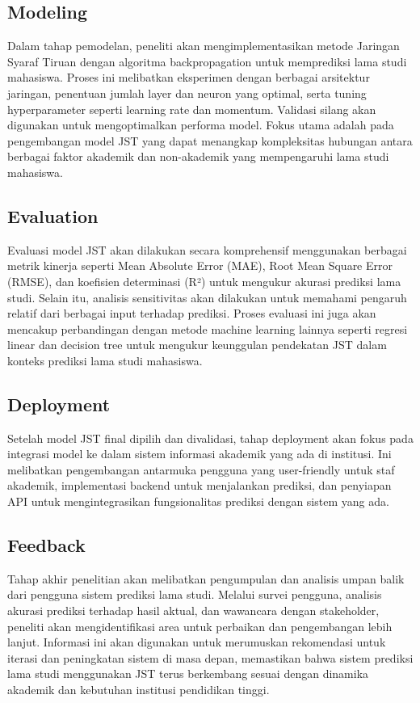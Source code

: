 \subsection{Modeling}
Dalam tahap pemodelan, peneliti akan mengimplementasikan metode Jaringan Syaraf Tiruan dengan algoritma backpropagation untuk memprediksi lama studi mahasiswa. Proses ini melibatkan eksperimen dengan berbagai arsitektur jaringan, penentuan jumlah layer dan neuron yang optimal, serta tuning hyperparameter seperti learning rate dan momentum. Validasi silang akan digunakan untuk mengoptimalkan performa model. Fokus utama adalah pada pengembangan model JST yang dapat menangkap kompleksitas hubungan antara berbagai faktor akademik dan non-akademik yang mempengaruhi lama studi mahasiswa.

\subsection{Evaluation}
Evaluasi model JST akan dilakukan secara komprehensif menggunakan berbagai metrik kinerja seperti Mean Absolute Error (MAE), Root Mean Square Error (RMSE), dan koefisien determinasi (R²) untuk mengukur akurasi prediksi lama studi. Selain itu, analisis sensitivitas akan dilakukan untuk memahami pengaruh relatif dari berbagai input terhadap prediksi. Proses evaluasi ini juga akan mencakup perbandingan dengan metode machine learning lainnya seperti regresi linear dan decision tree untuk mengukur keunggulan pendekatan JST dalam konteks prediksi lama studi mahasiswa.

\subsection{Deployment}
Setelah model JST final dipilih dan divalidasi, tahap deployment akan fokus pada integrasi model ke dalam sistem informasi akademik yang ada di institusi. Ini melibatkan pengembangan antarmuka pengguna yang user-friendly untuk staf akademik, implementasi backend untuk menjalankan prediksi, dan penyiapan API untuk mengintegrasikan fungsionalitas prediksi dengan sistem yang ada. 

\subsection{Feedback}
Tahap akhir penelitian akan melibatkan pengumpulan dan analisis umpan balik dari pengguna sistem prediksi lama studi. Melalui survei pengguna, analisis akurasi prediksi terhadap hasil aktual, dan wawancara dengan stakeholder, peneliti akan mengidentifikasi area untuk perbaikan dan pengembangan lebih lanjut. Informasi ini akan digunakan untuk merumuskan rekomendasi untuk iterasi dan peningkatan sistem di masa depan, memastikan bahwa sistem prediksi lama studi menggunakan JST terus berkembang sesuai dengan dinamika akademik dan kebutuhan institusi pendidikan tinggi.

